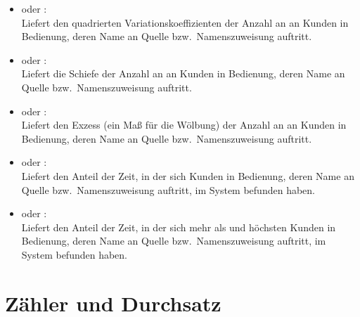 \begin{itemize}
\item
{} oder :\\
Liefert den quadrierten Variationskoeffizienten der Anzahl an an Kunden in Bedienung, deren Name an Quelle bzw.\ Namenszuweisung  auftritt.

\item
{} oder :\\
Liefert die Schiefe der Anzahl an an Kunden in Bedienung, deren Name an Quelle bzw.\ Namenszuweisung  auftritt.

\item
{} oder :\\
Liefert den Exzess (ein Maß für die Wölbung) der Anzahl an an Kunden in Bedienung, deren Name an Quelle bzw.\ Namenszuweisung  auftritt.

\item
{} oder :\\
Liefert den Anteil der Zeit, in der sich  Kunden in Bedienung, deren Name an Quelle bzw.\ Namenszuweisung  auftritt, im System befunden haben.

\item
{} oder :\\
Liefert den Anteil der Zeit, in der sich mehr als  und höchsten  Kunden in Bedienung, deren Name an Quelle bzw.\ Namenszuweisung  auftritt, im System befunden haben.

\end{itemize}





\section{Zähler und Durchsatz}

